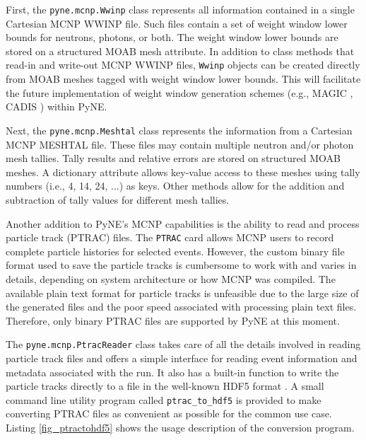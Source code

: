 \documentclass{anstrans}
\begin{document}
First, the \texttt{pyne.mcnp.Wwinp} class represents all information contained in a
single Cartesian MCNP WWINP file.   Such files contain a set of weight window lower
bounds for neutrons, photons, or both. The weight window lower bounds are
stored on a structured MOAB mesh attribute. In addition to class methods that
read-in and write-out MCNP WWINP files, \texttt{Wwinp} objects can be created
directly from MOAB meshes tagged with weight window lower bounds. This will
facilitate the future implementation of weight window generation schemes (e.g.,
MAGIC \cite{davis_comparison_2011}, CADIS \cite{haghighat_monte_2003}) within
PyNE.

Next, the \texttt{pyne.mcnp.Meshtal} class represents the information from a 
Cartesian MCNP MESHTAL file. These files may contain multiple neutron and/or 
photon mesh
tallies.  Tally results and relative errors are stored on structured MOAB
meshes. A dictionary attribute allows key-value access to these meshes using
tally numbers (i.e., 4, 14, 24, ...) as keys. Other methods allow for the
addition and subtraction of tally values for different mesh tallies.

Another addition to PyNE's MCNP capabilities is the ability to read and
process particle track (PTRAC) files. The \texttt{PTRAC} card allows MCNP
users to record complete particle histories for selected events. However,
the custom binary file format used to save the particle tracks is cumbersome
to work with and varies in details, depending on system architecture or
how MCNP was compiled. The available plain text format for particle
tracks is unfeasible due to the large size of the generated files and the
poor speed associated with processing plain text files. Therefore, only
binary PTRAC files are supported by PyNE at this moment.

The \texttt{pyne.mcnp.PtracReader} class takes care of all the details
involved in reading particle track files and offers a simple interface
for reading event information and metadata associated with the run.
It also has a built-in function to write the particle tracks directly
to a file in the well-known HDF5 format \cite{hdf5}.
A small command line utility program called \texttt{ptrac\_to\_hdf5} is
provided to make converting PTRAC files as convenient as possible
for the common use case. Listing \ref{fig_ptractohdf5} shows the usage
description of the conversion program.
\end{document}
